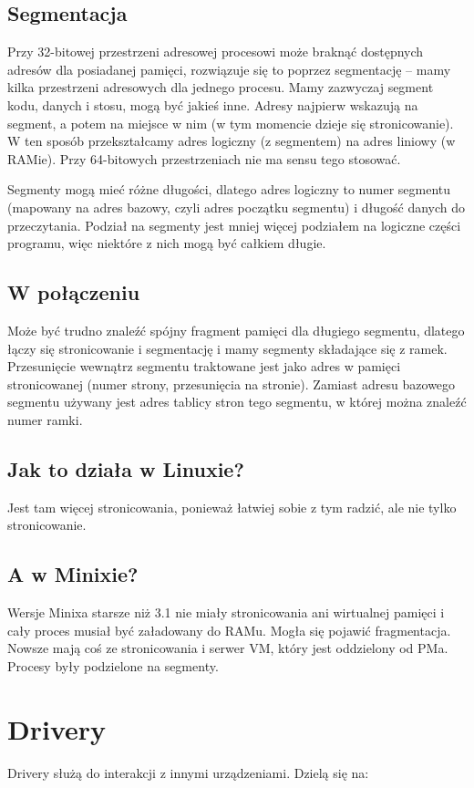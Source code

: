 \subsection{Segmentacja}
Przy 32-bitowej przestrzeni adresowej procesowi może braknąć dostępnych adresów dla posiadanej pamięci, rozwiązuje się to poprzez segmentację -- mamy kilka przestrzeni adresowych dla jednego procesu. Mamy zazwyczaj segment kodu, danych i stosu, mogą być jakieś inne. Adresy najpierw wskazują na segment, a potem na miejsce w nim (w tym momencie dzieje się stronicowanie). W ten sposób przekształcamy adres logiczny (z segmentem) na adres liniowy (w RAMie). Przy 64-bitowych przestrzeniach nie ma sensu tego stosować.

Segmenty mogą mieć różne długości, dlatego adres logiczny to numer segmentu (mapowany na adres bazowy, czyli adres początku segmentu) i długość danych do przeczytania. Podział na segmenty jest mniej więcej podziałem na logiczne części programu, więc niektóre z nich mogą być całkiem długie.
\subsection{W połączeniu}
Może być trudno znaleźć spójny fragment pamięci dla długiego segmentu, dlatego łączy się stronicowanie i segmentację i mamy segmenty składające się z ramek. Przesunięcie wewnątrz segmentu traktowane jest jako adres w pamięci stronicowanej (numer strony, przesunięcia na stronie). Zamiast adresu bazowego segmentu używany jest adres tablicy stron tego segmentu, w której można znaleźć numer ramki.
\subsection{Jak to działa w Linuxie?}
Jest tam więcej stronicowania, ponieważ łatwiej sobie z tym radzić, ale nie tylko stronicowanie.
\subsection{A w Minixie?}
Wersje Minixa starsze niż 3.1 nie miały stronicowania ani wirtualnej pamięci i cały proces musiał być załadowany do RAMu. Mogła się pojawić fragmentacja. Nowsze mają coś ze stronicowania i serwer VM, który jest oddzielony od PMa. Procesy były podzielone na segmenty.
\section{Drivery}
Drivery służą do interakcji z innymi urządzeniami.
Dzielą się na:

